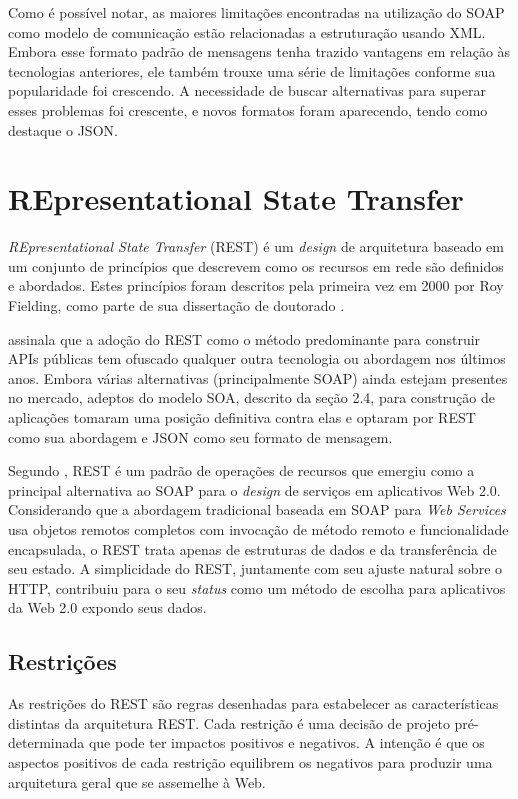 Como é possível notar, as maiores limitações encontradas na utilização do SOAP como modelo de comunicação estão relacionadas a estruturação usando XML. Embora esse formato padrão de mensagens tenha trazido vantagens em relação às tecnologias anteriores, ele também trouxe uma série de limitações conforme sua popularidade foi crescendo. A necessidade de buscar alternativas para superar esses problemas foi crescente, e novos formatos foram aparecendo, tendo como destaque o JSON.

\section{REpresentational State Transfer}\label{sec:rest}

\textit{REpresentational State Transfer} (REST) é um \textit{design} de arquitetura baseado em um conjunto de princípios que descrevem como os recursos em rede são definidos e abordados. Estes princípios foram descritos pela primeira vez em 2000 por Roy Fielding, como parte de sua dissertação de doutorado \cite{rest-intro}.

 assinala que a adoção do REST como o método predominante para construir APIs públicas tem ofuscado qualquer outra tecnologia ou abordagem nos últimos anos. Embora várias alternativas (principalmente SOAP) ainda estejam presentes no mercado, adeptos do modelo SOA, descrito da seção 2.4,  para construção de aplicações tomaram uma posição definitiva contra elas e optaram por REST como sua abordagem e JSON como seu formato de mensagem.

Segundo , REST é um padrão de operações de recursos que emergiu como a principal alternativa ao SOAP para o \textit{design} de serviços em aplicativos Web 2.0. Considerando que a abordagem tradicional baseada em SOAP para \textit{Web Services} usa objetos remotos completos com invocação de método remoto e funcionalidade encapsulada, o REST trata apenas de estruturas de dados e da transferência de seu estado. A simplicidade do REST, juntamente com seu ajuste natural sobre o HTTP, contribuiu para o seu \textit{status} como um método de escolha para aplicativos da Web 2.0 expondo seus dados.

\subsection{Restrições}

As restrições do REST são regras desenhadas para estabelecer as características distintas da arquitetura REST. Cada restrição é uma decisão de projeto pré-determinada que pode ter impactos positivos e negativos. A intenção é que os aspectos positivos de cada restrição equilibrem os negativos para produzir uma arquitetura geral que se assemelhe à Web.

